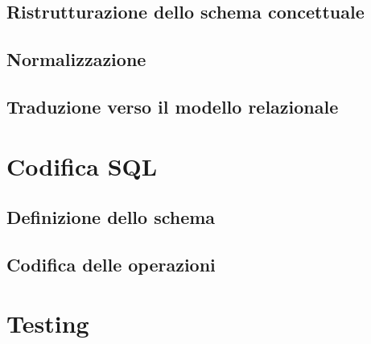 \documentclass[11pt]{article}
\begin{document}
\subsection{Ristrutturazione dello schema concettuale}
\subsection{Normalizzazione}
\subsection{Traduzione verso il modello relazionale}

\section{Codifica SQL}
\subsection{Definizione dello schema}
\subsection{Codifica delle operazioni}

\section{Testing}
\end{document}
